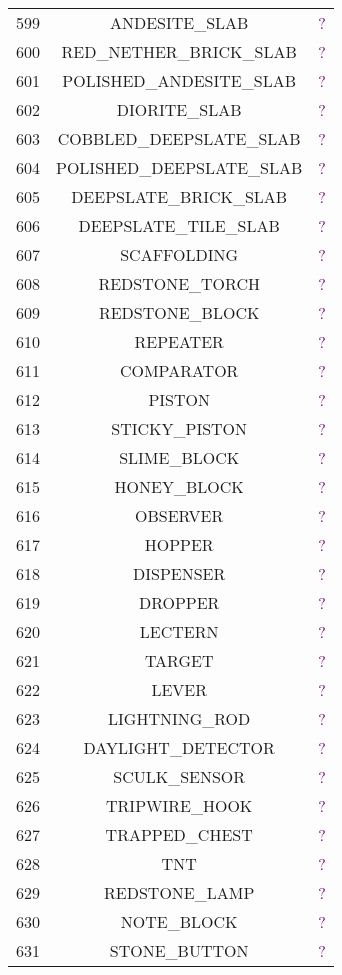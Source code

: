 \documentclass[11pt]{article}
\newcommand\myworries[1]{\textcolor{purple}{#1}}
\begin{document}
\begin{longtable}{ |c|c|c| }
	599 & ANDESITE\_SLAB & \myworries{?} \\
	600 & RED\_NETHER\_BRICK\_SLAB & \myworries{?} \\
	601 & POLISHED\_ANDESITE\_SLAB & \myworries{?} \\
	602 & DIORITE\_SLAB & \myworries{?} \\
	603 & COBBLED\_DEEPSLATE\_SLAB & \myworries{?} \\
	604 & POLISHED\_DEEPSLATE\_SLAB & \myworries{?} \\
	605 & DEEPSLATE\_BRICK\_SLAB & \myworries{?} \\
	606 & DEEPSLATE\_TILE\_SLAB & \myworries{?} \\
	607 & SCAFFOLDING & \myworries{?} \\
	608 & REDSTONE\_TORCH & \myworries{?} \\
	609 & REDSTONE\_BLOCK & \myworries{?} \\
	610 & REPEATER & \myworries{?} \\
	611 & COMPARATOR & \myworries{?} \\
	612 & PISTON & \myworries{?} \\
	613 & STICKY\_PISTON & \myworries{?} \\
	614 & SLIME\_BLOCK & \myworries{?} \\
	615 & HONEY\_BLOCK & \myworries{?} \\
	616 & OBSERVER & \myworries{?} \\
	617 & HOPPER & \myworries{?} \\
	618 & DISPENSER & \myworries{?} \\
	619 & DROPPER & \myworries{?} \\
	620 & LECTERN & \myworries{?} \\
	621 & TARGET & \myworries{?} \\
	622 & LEVER & \myworries{?} \\
	623 & LIGHTNING\_ROD & \myworries{?} \\
	624 & DAYLIGHT\_DETECTOR & \myworries{?} \\
	625 & SCULK\_SENSOR & \myworries{?} \\
	626 & TRIPWIRE\_HOOK & \myworries{?} \\
	627 & TRAPPED\_CHEST & \myworries{?} \\
	628 & TNT & \myworries{?} \\
	629 & REDSTONE\_LAMP & \myworries{?} \\
	630 & NOTE\_BLOCK & \myworries{?} \\
	631 & STONE\_BUTTON & \myworries{?} \\

\end{longtable}
\end{document}
